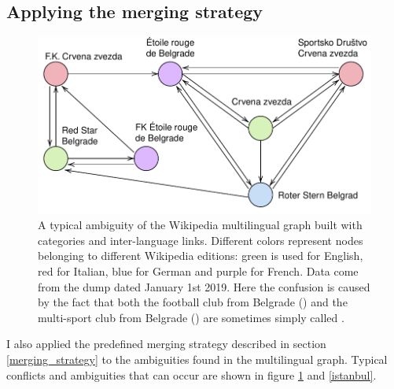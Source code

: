        \subsection{Applying the merging strategy}
            \begin{figure}
                \centering
                \includegraphics[width=\textwidth]{images/red_star.pdf}
                \caption{A typical ambiguity of the Wikipedia multilingual graph built with categories and inter-language links.  Different colors represent nodes belonging to different Wikipedia editions: green is used for English, red for Italian, blue for German and purple for French. Data come from the dump dated January 1st 2019. Here the confusion is caused by the fact that both the football club from Belgrade () and the multi-sport club from Belgrade () are sometimes simply called .}
                \label{red_star}
            \end{figure}
            
            I also applied the predefined merging strategy described in section \ref{merging_strategy} to the ambiguities found in the multilingual graph. Typical conflicts and ambiguities that can occur are shown in figure \ref{red_star} and \ref{istanbul}.
        
